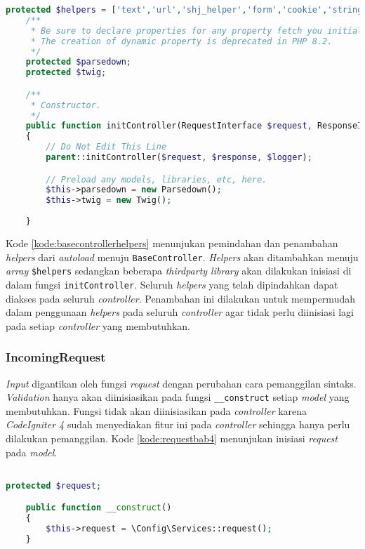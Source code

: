 \begin{lstlisting}[language=PHP, caption=Penambahan sintaks pada \texttt{BaseController}, label=kode:basecontrollerhelpers]
	protected $helpers = ['text','url','shj_helper','form','cookie','string','filesystem'];
	/**
     * Be sure to declare properties for any property fetch you initialized.
     * The creation of dynamic property is deprecated in PHP 8.2.
     */
    protected $parsedown;
    protected $twig;

    /**
     * Constructor.
     */
    public function initController(RequestInterface $request, ResponseInterface $response, LoggerInterface $logger)
    {
        // Do Not Edit This Line
        parent::initController($request, $response, $logger);

        // Preload any models, libraries, etc, here.
        $this->parsedown = new Parsedown();
        $this->twig = new Twig();
        
    }
\end{lstlisting}

Kode \ref{kode:basecontrollerhelpers} menunjukan pemindahan dan penambahan \textit{helpers} dari \textit{autoload} menuju \texttt{BaseController}. \textit{Helpers} akan ditambahkan menuju \textit{array} \texttt{\$helpers} sedangkan beberapa \textit{thirdparty library} akan dilakukan inisiasi di dalam fungsi \texttt{initController}. Seluruh \textit{helpers} yang telah dipindahkan dapat diakses pada seluruh \textit{controller}. Penambahan ini dilakukan untuk mempermudah dalam penggunaan \textit{helpers} pada seluruh \textit{controller} agar tidak perlu diinisiasi lagi pada setiap \textit{controller} yang membutuhkan.

\subsubsection{IncomingRequest}
\textit{Input} digantikan oleh fungsi \textit{request} dengan perubahan cara pemanggilan sintaks. \textit{Validation} hanya akan diinisiasikan pada fungsi \texttt{\_\_construct} setiap \textit{model} yang membutuhkan. Fungsi tidak akan diinisiasikan pada \textit{controller} karena \textit{CodeIgniter 4} sudah menyediakan fitur ini pada \textit{controller} sehingga hanya perlu dilakukan pemanggilan. Kode \ref{kode:requestbab4} menunjukan inisiasi \textit{request} pada \textit{model}.

\begin{lstlisting}[language=PHP, caption=Perancangan inisiasi \textit{request} pada \texttt{\_\_construct}, label=kode:requestbab4]

protected $request;

	public function __construct()
	{
		$this->request = \Config\Services::request(); 
	}
\end{lstlisting}

